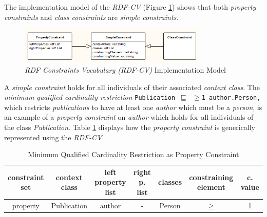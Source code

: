 \documentclass[a4paper,fontsize=11pt]{scrartcl}
\newcommand{\ms}[1]{\texttt{#1}}
\begin{document}
The implementation model of the \emph{RDF-CV} (Figure \ref{fig:RDF-CV-implementation-model}) shows that
both \emph{property constraints} and \emph{class constraints} are \emph{simple constraints}. 
\begin{figure}[H]
	\centering
		\includegraphics[width=0.80\textwidth]{images/RDF-CV-implementation-model.png}
	\caption{\emph{RDF Constraints Vocabulary (RDF-CV)} Implementation Model}
	\label{fig:RDF-CV-implementation-model}
\end{figure}
A \emph{simple constraint} holds for all individuals of their associated \emph{context class}.
The \emph{minimum qualified cardinality restriction} {\small\ms{Publication $\sqsubseteq$ $\geq$1 author.Person,}}
which restricts \emph{publications} to have at least one \emph{author} which must be a \emph{person},
is an example of a \emph{property constraint} on \emph{author}
which holds for all individuals of the class \emph{Publication}.
Table \ref{tab:property-constraint-cardinality-restriction} displays how the \emph{property constraint} is generically represented using the \emph{RDF-CV}.
\begin{table}[H]
  \scriptsize
  \sffamily
  \vspace{0cm}
	\caption{Minimum Qualified Cardinality Restriction as Property Constraint}
	\label{tab:property-constraint-cardinality-restriction}
	\centering
		\begin{tabular}{c|c|c|c|c|c|c}
      \textbf{constraint set} & \textbf{context class} & \textbf{left property list} & \textbf{right p. list} & \textbf{classes} & \textbf{constraining element} & \textbf{c. value} \\
      \hline
      property & Publication & author & - & Person & $\geq$ & 1 \\
		\end{tabular}
\end{table}

\end{document}
